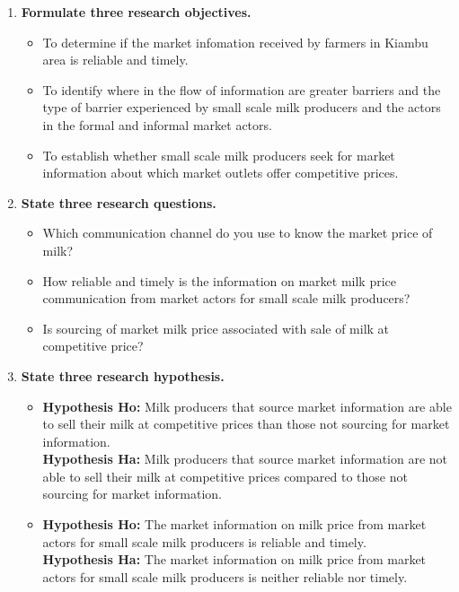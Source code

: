 \documentclass[11pt]{article}
\begin{document}
\begin{enumerate}
\item \textbf{Formulate three research objectives.}
  \begin{itemize}
  \item To determine if the market infomation received by farmers in Kiambu area is reliable and timely.
  \item To identify where in the flow of information are greater barriers and the type of barrier experienced by small scale milk producers and the actors in the formal and informal market actors.
  \item To establish whether small scale milk producers seek for market information about which market outlets offer competitive prices.
  \end{itemize}
\item \textbf{State three research questions.}
  \begin{itemize}
  \item Which communication channel do you use to know the market price of milk?
  \item How reliable and timely is the information on market milk price communication from market actors for small scale milk producers?
  \item Is sourcing of market milk price associated with sale of milk at competitive price?
  \end{itemize}
\item \textbf{State three research hypothesis.}
  \begin{itemize}
  \item \textbf{Hypothesis Ho:} Milk producers that source market information are able
to sell their milk at competitive prices than those not sourcing for market information. \\
\textbf{Hypothesis Ha:} Milk producers that source market information are not able to sell their milk at competitive prices compared to those not sourcing for market information.
  \item \textbf{Hypothesis Ho:} The market information on milk price from market actors for
    small scale milk producers is reliable and timely. \\
    \textbf{Hypothesis Ha:} The market information on milk price from market actors for
small scale milk producers is neither reliable nor timely.
    

\end{itemize}
\end{enumerate}
\end{document}
